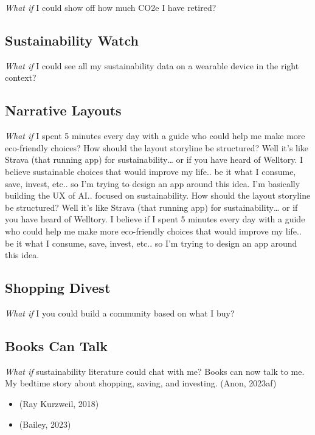 \documentclass[
  letterpaper,
  DIV=11,
  numbers=noendperiod]{scrartcl}
\providecommand{\tightlist}{%
  \setlength{\itemsep}{0pt}\setlength{\parskip}{0pt}}\usepackage{longtable,booktabs,array}
\begin{document}
\emph{What if} I could show off how much CO2e I have retired?

\subsection{Sustainability Watch}\label{sustainability-watch}

\emph{What if} I could see all my sustainability data on a wearable
device in the right context?

\subsection{Narrative Layouts}\label{narrative-layouts}

\emph{What if} I spent 5 minutes every day with a guide who could help
me make more eco-friendly choices? How should the layout storyline be
structured? Well it's like Strava (that running app) for
sustainability\ldots{} or if you have heard of Welltory. I believe
sustainable choices that would improve my life.. be it what I consume,
save, invest, etc.. so I'm trying to design an app around this idea. I'm
basically building the UX of AI.. focused on sustainability. How should
the layout storyline be structured? Well it's like Strava (that running
app) for sustainability\ldots{} or if you have heard of Welltory. I
believe if I spent 5 minutes every day with a guide who could help me
make more eco-friendly choices that would improve my life.. be it what I
consume, save, invest, etc.. so I'm trying to design an app around this
idea.

\subsection{Shopping Divest}\label{shopping-divest}

\emph{What if} I you could build a community based on what I buy?

\subsection{Books Can Talk}\label{books-can-talk}

\emph{What if} sustainability literature could chat with me? Books can
now talk to me. My bedtime story about shopping, saving, and investing.
(Anon, 2023af)

\begin{itemize}
\tightlist
\item
  (Ray Kurzweil, 2018)
\item
  (Bailey, 2023)
\end{itemize}
\end{document}
